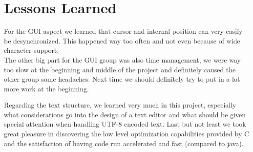 \section{Lessons Learned}\label{sec:lessons}
For the GUI aspect we learned that cursor and internal position can very easily be desynchronized. This happened way too often and not even because of wide character support.
\\The other big part for the GUI group was also time management, we were way too slow at the beginning and middle of the project and definitely caused the other group some headaches. Next time we should definitely try to put in a lot more work at the beginning.
\medskip

Regarding the text structure, we learned very much in this project, especially  what considerations go into the design of a text editor and what should be given special attention when handling UTF-8 encoded text. Last but not least we took great pleasure in discovering the low level optimization capabilities provided by C and the satisfaction of having code run accelerated and fast (compared to java).